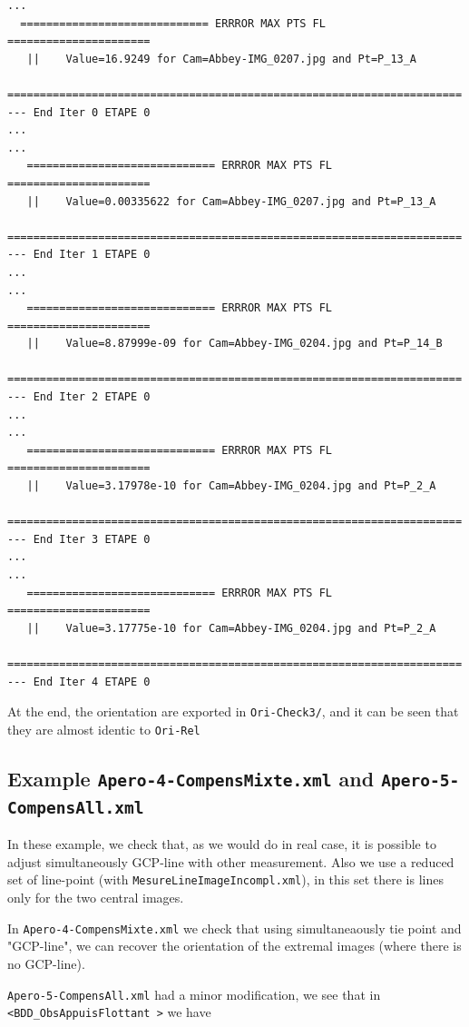 \begin{verbatim}
...
  ============================= ERRROR MAX PTS FL ======================
   ||    Value=16.9249 for Cam=Abbey-IMG_0207.jpg and Pt=P_13_A
   ======================================================================
--- End Iter 0 ETAPE 0
...
...
   ============================= ERRROR MAX PTS FL ======================
   ||    Value=0.00335622 for Cam=Abbey-IMG_0207.jpg and Pt=P_13_A
   ======================================================================
--- End Iter 1 ETAPE 0
...
...
   ============================= ERRROR MAX PTS FL ======================
   ||    Value=8.87999e-09 for Cam=Abbey-IMG_0204.jpg and Pt=P_14_B
   ======================================================================
--- End Iter 2 ETAPE 0
...
...
   ============================= ERRROR MAX PTS FL ======================
   ||    Value=3.17978e-10 for Cam=Abbey-IMG_0204.jpg and Pt=P_2_A
   ======================================================================
--- End Iter 3 ETAPE 0
...
...
   ============================= ERRROR MAX PTS FL ======================
   ||    Value=3.17775e-10 for Cam=Abbey-IMG_0204.jpg and Pt=P_2_A
   ======================================================================
--- End Iter 4 ETAPE 0

\end{verbatim}

At the end, the orientation are exported in {\tt Ori-Check3/}, and it can be seen that they are almost identic to {\tt Ori-Rel}



\subsection{Example {\tt Apero-4-CompensMixte.xml} and  {\tt  Apero-5-CompensAll.xml}}

In these example, we check that, as we would do in real case, it is possible to adjust simultaneously GCP-line with
other measurement. Also we use a reduced set of line-point (with {\tt MesureLineImageIncompl.xml}), in this set
there is lines only for the two central images. 

In {\tt Apero-4-CompensMixte.xml} we check that using simultaneaously tie point and "GCP-line", we can recover the orientation
of the extremal images (where there is no GCP-line).

{\tt  Apero-5-CompensAll.xml} had a minor modification, we see that in {\tt <BDD\_ObsAppuisFlottant >} we have

